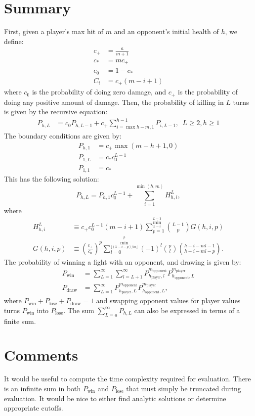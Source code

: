 	\section{Summary}
		First, given a player's max hit of $m$ and an opponent's initial health of $h$, we define:
		\begin{align}
			c_+ &= \frac{a}{m+1} \\
			c_* &= mc_+ \\
			c_0 &= 1 - c_* \\
			C_i &= c_+ (m - i + 1)
		\end{align}
		where $c_0$ is the probability of doing zero damage, and $c_+$ is the probability of doing any positive amount of damage.
		Then, the probability of killing in $L$ turns is given by the recursive equation:
		\begin{align}
			P_{h, L} &= c_0P_{h, L - 1} + c_+ \sum_{i=\max{h - m, 1}}^{h-1} P_{i, L-1},\,\,\, L \ge 2, h \ge 1
		\end{align}
		The boundary conditions are given by:
		\begin{align}
			P_{h, 1} &= c_+ \max(m - h + 1, 0)\\
			P_{1, L} &= c_* c_0^{L-1}\\
			P_{1, 1} &= c_*
		\end{align}
		This has the following solution:
		\begin{equation}
			P_{h, L} = P_{h, 1}c_0^{L-1}  + \sum_{i=1}^{\min(h, m)} H_{h, i}^L,
		\end{equation}
		where
		\begin{align}
			H_{h, i}^L &\equiv c_+c_0^{L-1} (m - i + 1)\sum_{p=1}^{\min_{h-i}^{L-1}} {L-1 \choose p}  G(h, i, p) \\
			G(h, i, p) &\equiv \left(\frac{c_+}{c_0}\right)^p  \sum_{l=0}^{\min_{\lfloor (h-i-p) / m \rfloor}^{p}} (-1)^l  {p \choose l} {h-i-ml-1\choose h-i-ml-p}.
		\end{align}
		The probability of winning a fight with an opponent, and drawing is given by:
		\begin{align}
			P_\text{win} &= \sum_{L=1}^\infty \sum_{l=L+1}^\infty P_{h_\text{player}, l}^{m_\text{opponent}} P_{h_\text{opponent}, L}^{m_\text{player}}\\
			P_\text{draw} &= \sum_{L=1}^\infty P_{h_\text{player}, L}^{m_\text{opponent}} P_{h_\text{opponent}, L}^{m_\text{player}},
		\end{align}
		where $P_\text{win} + P_\text{lose} + P_\text{draw} = 1$ and swapping opponent values for player values turns $P_\text{win}$ into $P_\text{lose}$. The sum $\sum_{L=a}^\infty P_{h, L}$ can also be expressed in terms of a finite sum.

	\section{Comments}
		It would be useful to compute the time complexity required for evaluation. There is an infinite sum in both $P_\text{win}$ and $P_\text{lose}$ that must simply be truncated during evaluation. It would be nice to either find analytic solutions or determine appropriate cutoffs.
	
